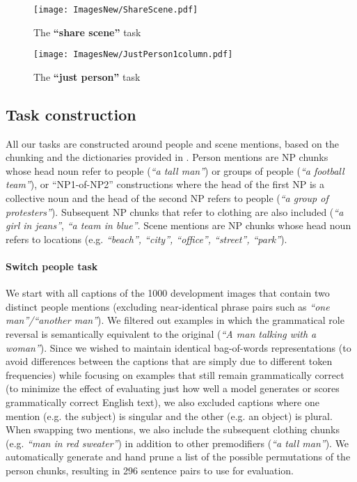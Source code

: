 \documentclass[11pt]{article}
\begin{document}
\begin{figure}[tb]
\centering \texttt{[image: ImagesNew/ShareScene.pdf]} \vspace{-1in}
\caption{The \textbf{``share scene''} task}
\label{fig:ShareScene} 
\end{figure}

\begin{figure}[tb] 
\centering \texttt{[image: ImagesNew/JustPerson1column.pdf]} \vspace{-.5in}
\caption{The \textbf{``just person''} task}
\label{fig:JustPerson} 
\end{figure}


\subsection{Task construction}
All our tasks are constructed around people and scene mentions, based on the chunking and the dictionaries provided in . Person mentions are NP chunks whose head noun refer to people (\textit{``a tall man''}) or groups of people (\textit{``a football team''}), or ``NP1-of-NP2'' constructions where the head of the first NP is a collective noun and the head of the second NP refers to people (\textit{``a group of protesters''}). Subsequent NP chunks that refer to clothing are also included (\textit{``a girl in jeans''}, \textit{``a team in blue''}. Scene mentions are NP chunks whose head noun refers to locations (e.g. \textit{``beach'', ``city'', ``office'', ``street'', ``park''}).

\paragraph{Switch people task}
We start with all captions of the 1000 development images that contain two distinct people mentions (excluding near-identical phrase pairs such as \textit{``one man''/``another man''}). We filtered out examples in which the grammatical role reversal is semantically equivalent to the original (\textit{``A man talking with a woman''}). Since we wished to maintain identical bag-of-words representations (to avoid differences between the captions that are simply due to different token frequencies) while focusing on examples that still remain grammatically correct (to minimize the effect of evaluating just how well a model generates or scores grammatically correct English text), we also excluded captions where one mention (e.g. the subject) is singular and the other (e.g. an object) is plural.  When swapping two mentions, we also include the subsequent clothing chunks (e.g. \textit{``man in red sweater''}) in addition to other premodifiers (\textit{``a tall man''}).  We automatically generate and hand prune a list of the possible permutations of the person chunks, resulting in 296 sentence pairs to use for evaluation.
\end{document}
